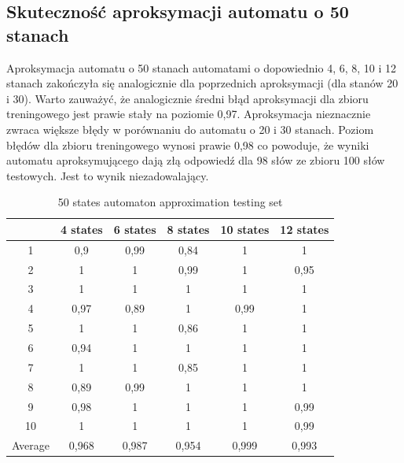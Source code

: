 \documentclass[runningheads,a4paper]{llncs}
\begin{document}
\FloatBarrier
\subsection{Skuteczność aproksymacji automatu o 50 stanach}

Aproksymacja automatu o 50 stanach automatami o dopowiednio 4, 6, 8, 10 i 12 stanach zakończyła się analogicznie dla poprzednich aproksymacji (dla stanów 20 i 30). Warto zauważyć, że analogicznie średni błąd aproksymacji dla zbioru treningowego jest prawie stały na poziomie 0,97. Aproksymacja nieznacznie zwraca większe błędy w porównaniu do automatu o 20 i 30 stanach. Poziom błędów dla zbioru treningowego wynosi prawie 0,98 co powoduje, że wyniki automatu aproksymującego dają złą odpowiedź dla 98 słów ze zbioru 100 słów testowych. Jest to wynik niezadowalający.\\

\begin{table}[]
\centering
\caption{50 states automaton approximation testing set}
\label{my-label}
\begin{tabular}{@{}cccccc@{}}
\toprule
        & 4 states & 6 states & 8 states & 10 states & 12 states    \\ \midrule
1       & 0,9      & 0,99     & 0,84     & 1         & 1 \\
2       & 1        & 1        & 0,99     & 1         & 0,95 \\
3       & 1        & 1        & 1        & 1         & 1 \\
4       & 0,97     & 0,89     & 1        & 0,99      & 1   \\
5       & 1        & 1        & 0,86     & 1         & 1   \\
6       & 0,94     & 1        & 1        & 1         & 1    \\
7       & 1        & 1        & 0,85     & 1         & 1    \\
8       & 0,89     & 0,99     & 1        & 1         & 1     \\
9       & 0,98     & 1        & 1        & 1         & 0,99 \\
10      & 1        & 1        & 1        & 1         & 0,99  \\
Average & 0,968    & 0,987    & 0,954    & 0,999     & 0,993  \\ \bottomrule
\end{tabular}
\end{table}
\end{document}

